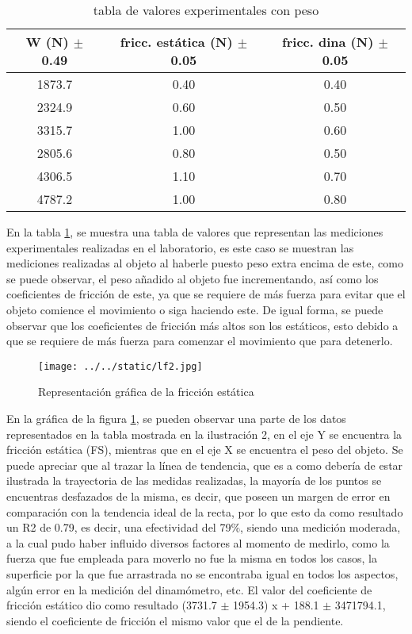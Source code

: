 \documentclass{article}
\begin{document}
\begin{table}[H]
	\centering	
	\begin{tabular}{|c|c|c|}
		\hline
		W (N) $\pm$ 0.49 & fricc. estática (N) $\pm$ 0.05 & fricc. dina (N) $\pm$ 0.05 \\  	
		\hline
		1873.7 & 0.40 & 0.40 \\
		\hline
		2324.9 & 0.60 & 0.50 \\
		\hline
		3315.7 & 1.00 & 0.60 \\
		\hline
		2805.6 & 0.80 & 0.50 \\
		\hline
		4306.5 & 1.10 & 0.70 \\
		\hline
		4787.2 & 1.00 & 0.80 \\
		\hline
	\end{tabular}
	\caption{tabla de valores experimentales con peso}
	\label{tab:2}
\end{table}

En la tabla \ref{tab:2}, se muestra una tabla de valores que representan las mediciones experimentales realizadas en el laboratorio, es este caso se muestran las mediciones realizadas al objeto al haberle puesto peso extra encima de este, como se puede observar, el peso añadido al objeto fue incrementando, así como los coeficientes de fricción de este, ya que se requiere de más fuerza para evitar que el objeto comience el movimiento o siga haciendo este. De igual forma, se puede observar que los coeficientes de fricción más altos son los estáticos, esto debido a que se requiere de más fuerza para comenzar el movimiento que para detenerlo. 

\begin{figure}[H]
		\centering
		\texttt{[image: ../../static/lf2.jpg]}	
		\caption{Representación gráfica de la fricción estática}
		\label{fig:2}
	\end{figure}

En la gráfica de la figura \ref{fig:2}, se pueden observar una parte de los datos representados en la tabla mostrada en la ilustración 2, en el eje Y se encuentra la fricción estática (FS), mientras que en el eje X se encuentra el peso del objeto. Se puede apreciar que al trazar la línea de tendencia, que es a como debería de estar ilustrada la trayectoria de las medidas realizadas, la mayoría de los puntos se encuentras desfazados de la misma, es decir, que poseen un margen de error en comparación con la tendencia ideal de la recta, por lo que esto da como resultado un R2 de 0.79, es decir, una efectividad del 79$\%$, siendo una medición moderada, a la cual pudo haber influido diversos factores al momento de medirlo, como la fuerza que fue empleada para moverlo no fue la misma en todos los casos, la superficie por la que fue arrastrada no se encontraba igual en todos los aspectos, algún error en la medición del dinamómetro, etc. El valor del coeficiente de fricción estático dio como resultado (3731.7 $\pm$ 1954.3) x + 188.1 $\pm$ 3471794.1, siendo el coeficiente de fricción el mismo valor que el de la pendiente.
\end{document}
